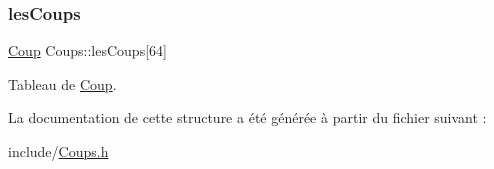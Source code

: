 \subsubsection{\texorpdfstring{les\+Coups}{lesCoups}}
{\footnotesize\ttfamily \hyperlink{structCoup}{Coup} Coups\+::les\+Coups\mbox{[}64\mbox{]}}



Tableau de \hyperlink{structCoup}{Coup}. 



La documentation de cette structure a été générée à partir du fichier suivant \+:\begin{DoxyCompactItemize}
\item 
include/\hyperlink{Coups_8h}{Coups.\+h}\end{DoxyCompactItemize}
